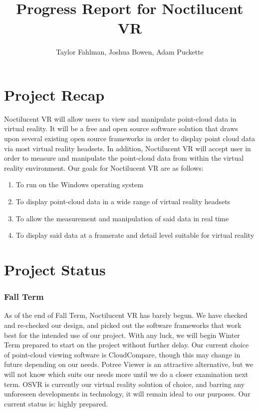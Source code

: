\documentclass{article}
\begin{document}
\title {Progress Report for Noctilucent VR}
\author {Taylor Fahlman, Joshua Bowen, Adam Puckette}

\maketitle

\section{Project Recap}

Noctilucent VR will allow users to view and manipulate point-cloud data in virtual reality. 
It will be a free and open source software solution that draws upon several existing open source frameworks in order to display point cloud data via most virtual reality headsets. 
In addition, Noctilucent VR will accept user in order to measure and manipulate the point-cloud data from within the virtual reality environment. 
Our goals for Noctilucent VR are as follows:

\begin{enumerate}
\item To run on the Windows operating system
\item To display point-cloud data in a wide range of virtual reality headsets
\item To allow the measurement and manipulation of said data in real time
\item To display said data at a framerate and detail level suitable for virtual reality
\end{enumerate}

\section{Project Status}

\subsubsection{Fall Term}

As of the end of Fall Term, Noctilucent VR has barely begun. 
We have checked and re-checked our design, and picked out the software frameworks that work best for the intended use of our project. 
With any luck, we will begin Winter Term prepared to start on the project without further delay. 
Our current choice of point-cloud viewing software is CloudCompare, though this may change in future depending on our needs. 
Potree Viewer is an attractive alternative, but we will not know which suits our needs more until we do a closer examination next term. 
OSVR is currently our virtual reality solution of choice, and barring any unforeseen developments in technology, it will remain ideal to our purposes. 
Our current status is: highly prepared.
\end{document}
